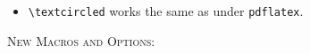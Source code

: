 \documentclass[11pt]{article}
\theoremstyle{oldplain}
\theoremstyle{plain}
\begin{document}
\begin{itemize}

\item \verb|\textcircled| works the same as under {\tt pdflatex}.%
\end{itemize}
\textsc{New Macros and Options:}
\end{document}
